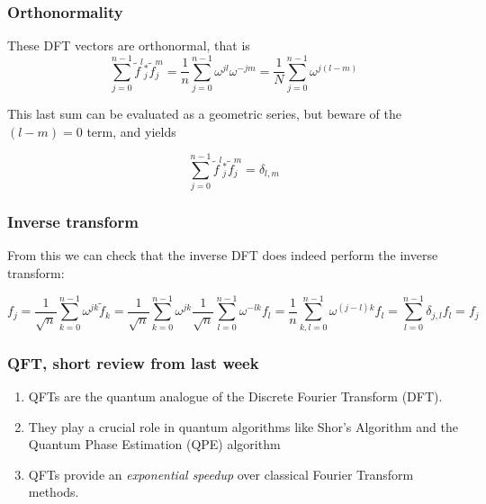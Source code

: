 \documentclass{beamer}
\begin{document}
\begin{frame}
\frametitle{Orthonormality}

These DFT vectors are orthonormal, that is
\begin{equation*}
\sum_{j=0}^{n-1} \tilde{f}^{l}{ }_{j}^{*} \tilde{f}_{j}^{m}=\frac{1}{n} \sum_{j=0}^{n-1} \omega^{j l} \omega^{-j m}=\frac{1}{N} \sum_{j=0}^{n-1} \omega^{j(l-m)} 
\end{equation*}

This last sum can be evaluated as a geometric series, but beware of the $(l-m)=0$ term, and yields

\begin{equation*}
\sum_{j=0}^{n-1} \tilde{f}^{l}{ }_{j}^{*} \tilde{f}_{j}^{m}=\delta_{l, m}
\end{equation*}
\end{frame}

\begin{frame}
\frametitle{Inverse transform}

From this we can check that the inverse DFT does indeed perform the inverse transform:

\begin{equation*}
f_{j}=\frac{1}{\sqrt{n}} \sum_{k=0}^{n-1} \omega^{j k} \tilde{f}_{k}=\frac{1}{\sqrt{n}} \sum_{k=0}^{n-1} \omega^{j k} \frac{1}{\sqrt{n}} \sum_{l=0}^{n-1} \omega^{-l k} f_{l}=\frac{1}{n} \sum_{k, l=0}^{n-1} \omega^{(j-l) k} f_{l}=\sum_{l=0}^{n-1} \delta_{j, l} f_{l}=f_{j} 
\end{equation*}
\end{frame}

\begin{frame}
\frametitle{QFT, short review from last week}

\begin{enumerate}
\item QFTs are the quantum analogue of the Discrete Fourier Transform (DFT).

\item They play a crucial role in quantum algorithms like Shor’s Algorithm and the Quantum Phase Estimation (QPE) algorithm

\item QFTs provide an \emph{exponential speedup} over classical Fourier Transform methods.
\end{enumerate}

\noindent
\end{frame}
\end{document}
